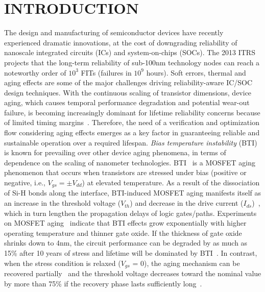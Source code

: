 \section{INTRODUCTION}
The design and manufacturing of semiconductor devices have recently experienced dramatic innovations, at the cost of downgrading reliability of nanoscale integrated circuits (ICs) and system-on-chips (SOCs). The 2013 ITRS~\cite{itrs2013} projects that the long-term reliability of sub-100nm technology nodes can reach a noteworthy order of $10^3$ FITs (failures in $10^9$ hours). Soft errors, thermal and aging effects are some of the major challenges driving reliability-aware IC/SOC design techniques. With the continuous scaling of transistor dimensions, device aging, which causes temporal performance degradation and potential wear-out failure, is becoming increasingly dominant for lifetime reliability concerns because of limited timing margins~\cite{mcpherson2006reliability}. Therefore, the need of a verification and optimization flow considering aging effects emerges as a key factor in guaranteeing reliable and sustainable operation over a required lifespan.
\textit{Bias temperature instability} (BTI) is known for prevailing over other device aging phenomena, in terms of dependence on the scaling of nanometer technologies. BTI~\cite{schroder2003negative} is a MOSFET aging phenomenon that occurs when transistors are stressed under bias (positive or negative, i.e., $V_{gs} = \pm V_{dd}$) at elevated temperature. As a result of the dissociation of Si-H bonds along the  interface, BTI-induced MOSFET aging manifests itself as an increase in the threshold voltage ($V_{th}$) and decrease in the drive current ($I_{ds}$)~\cite{stathis2006negative}, which in turn lengthen the propagation delays of logic gates/paths. Experiments on MOSFET aging~\cite{chakravarthi2004comprehensive} indicate that BTI effects grow exponentially with higher operating temperature and thinner gate oxide. If the thickness of gate oxide shrinks down to 4nm, the circuit performance can be degraded by as much as 15\% after 10 years of stress and lifetime will be dominated by BTI~\cite{kimizuka1999impact}. In contrast, when the stress condition is relaxed ($V_{gs}$ = 0), the aging mechanism can be recovered partially~\cite{kumar2006analytical} and the threshold voltage decreases toward the nominal value by more than 75\% if the recovery phase lasts sufficiently long~\cite{wang2010impact}.
